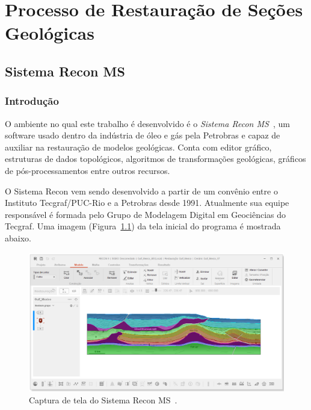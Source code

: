 
\chapter{Processo de Restauração de Seções Geológicas}

\section{Sistema Recon MS}

\subsection{Introdução}

O ambiente no qual este trabalho é desenvolvido é o \textit{Sistema Recon MS}~\cite{ReconTecgraf}, um software usado dentro da indústria de óleo e gás pela Petrobras e capaz de auxiliar na restauração de modelos geológicas. Conta com editor gráfico, estruturas de dados topológicos, algoritmos de transformações geológicas, gráficos de pós-processamentos entre outros recursos.

O Sistema Recon vem sendo desenvolvido a partir de um convênio entre o Instituto Tecgraf/PUC-Rio e a Petrobras desde 1991. Atualmente sua equipe responsável é formada pelo Grupo de Modelagem Digital em Geociências do Tecgraf. Uma imagem (Figura~\ref{fig-recon}) da tela inicial do programa é mostrada abaixo.

\begin{figure} [H]
  \begin{center}
    \includegraphics[width=\textwidth]{images/fig-recon}
    \caption{Captura de tela do Sistema Recon MS~\cite{Recon}.}\label{fig-recon}
  \end{center}
\end{figure}

